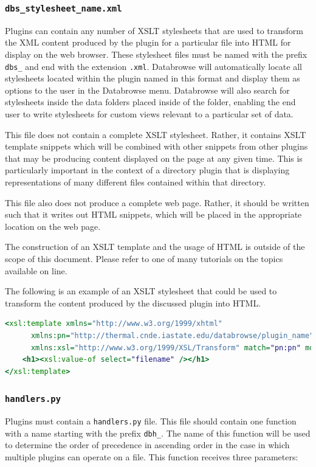 \documentclass[10pt]{article}
\begin{document}
\clearpage
\subsubsection{\texttt{dbs\_stylesheet\_name.xml}} \label{Stylesheet}
Plugins can contain any number of XSLT stylesheets that are used to transform the XML content produced by the plugin for a particular file into HTML for display on the web browser.  These stylesheet files must be named with the prefix \texttt{dbs\_} and end with the extension \texttt{.xml}.  Databrowse will automatically locate all stylesheets located within the plugin named in this format and display them as options to the user in the Databrowse menu.  Databrowse will also search for stylesheets inside the data folders placed inside of the  folder, enabling the end user to write stylesheets for custom views relevant to a particular set of data.  

This file does not contain a complete XSLT stylesheet.  Rather, it contains XSLT template snippets which will be combined with other snippets from other plugins that may be producing content displayed on the page at any given time.  This is particularly important in the context of a directory plugin that is displaying representations of many different files contained within that directory.

This file also does not produce a complete web page.  Rather, it should be written such that it writes out HTML snippets, which will be placed in the appropriate location on the web page.

The construction of an XSLT template and the usage of HTML is outside of the scope of this document.  Please refer to one of many tutorials on the topics available on line.

The following is an example of an XSLT stylesheet that could be used to transform the content produced by the discussed plugin into HTML.

\begin{lstlisting}[language=XSLT]
<xsl:template xmlns="http://www.w3.org/1999/xhtml" 
      xmlns:pn="http://thermal.cnde.iastate.edu/databrowse/plugin_name" 
      xmlns:xsl="http://www.w3.org/1999/XSL/Transform" match="pn:pn" mode="full">
    <h1><xsl:value-of select="filename" /></h1>
</xsl:template>
\end{lstlisting}

\clearpage
\subsubsection{\texttt{handlers.py}}
Plugins must contain a \texttt{handlers.py} file.  This file should contain one function with a name starting with the prefix \texttt{dbh\_}.  The name of this function will be used to determine the order of precedence in ascending order in the case in which multiple plugins can operate on a file.  This function receives three parameters:
\end{document}
